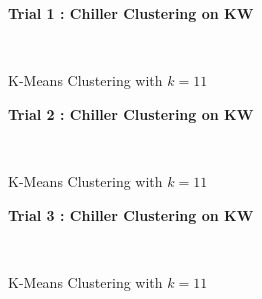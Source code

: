 \begin{figure}[!h]
\centerline{\bfseries\Large Trial 1 : Chiller Clustering on KW}\\
\caption{K-Means Clustering with $k=11$}
\end{figure}
\begin{figure}[!h]
\centerline{\bfseries\Large Trial 2 : Chiller Clustering on KW}\\
\caption{K-Means Clustering with $k=11$}
\end{figure}
\begin{figure}[!h]
\centerline{\bfseries\Large Trial 3 : Chiller Clustering on KW}\\
\caption{K-Means Clustering with $k=11$}
\end{figure}
